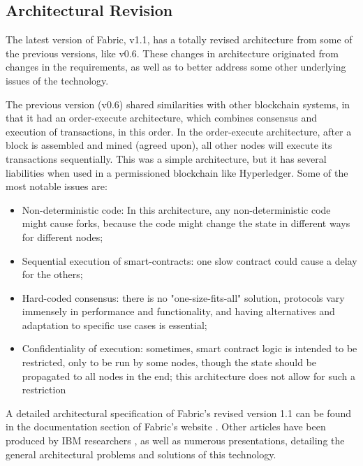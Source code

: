 
\subsection{Architectural Revision}
The latest version of Fabric, v1.1, has a totally revised architecture from some of the previous versions, like v0.6. These changes in architecture originated from changes in the requirements, as well as to better address some other underlying issues of the technology.

The previous version (v0.6) shared similarities with other blockchain systems, in that it had an order-execute architecture, which combines consensus and execution of transactions, in this order. In the order-execute architecture, after a block is assembled and mined (agreed upon), all other nodes will execute its transactions sequentially.
This was a simple architecture, but it has several liabilities when used in a permissioned blockchain like Hyperledger. Some of the most notable issues are:
\begin{itemize}
\item Non-deterministic code: In this architecture, any non-deterministic code might cause forks, because the code might change the state in different ways for different nodes;
\item Sequential execution of smart-contracts: one slow contract could cause a delay for the others;
\item Hard-coded consensus: there is no "one-size-fits-all" solution, protocols vary immensely in performance and functionality, and having alternatives and adaptation to specific use cases is essential;
\item Confidentiality of execution: sometimes, smart contract logic is intended to be restricted, only to be run by some nodes, though the state should be propagated to all nodes in the end; this architecture does not allow for such a restriction
\end{itemize}
A detailed architectural specification of Fabric's revised version 1.1 can be found in the documentation section of Fabric's website \cite{FabricDocArch} \cite{IBMResearch2017}. Other articles have been produced by IBM researchers \cite{Cachin2016} \cite{Vukolic2017}, as well as numerous presentations, detailing the general architectural problems and solutions of this technology.

